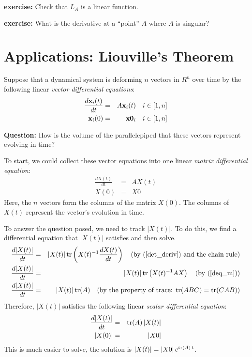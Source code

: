 \documentclass{article}
\begin{document}
{\bf exercise:} Check that $L_A$ is a linear function.

{\bf exercise:} What is the derivative at a ``point'' $A$ where $A$ is singular?

\section{Applications: Liouville's Theorem}
Suppose that a dynamical system is deforming $n$ vectors in $R^n$ over time by
the following linear {\em vector differential equations\/}:
\begin{eqnarray}
  \frac{d {\bf x}_i(t)}{dt} & = & A {\bf x}_i(t) \quad i \in [1, n] \label{deq_v}\\
  {\bf x}_i(0) & = & {\bf x0}_i \quad i \in [1,n]
\end{eqnarray}

{\bf Question:\/} How is the volume of the parallelepiped that these vectors represent
evolving in time?

To start, we could collect these vector equations into one linear
{\em matrix differential equation\/}:
\begin{eqnarray}
  \frac{d X(t)}{dt} & = & A X(t) \label{deq_m}\\
  X(0) & = & X0
\end{eqnarray}
Here, the $n$ vectors form the columns of the matrix $X(0)$. The columns of
$X(t)$ represent the vector's evolution in time.

To answer the question posed, 
we need to track $|X(t)|$. To do this, we find a differential equation
that $|X(t)|$ satisfies and then solve.
\begin{eqnarray*}
  \frac{d |X(t)|}{dt} & = & |X(t)| \, {\rm tr}\left(X(t)^{-1} \frac{d X(t)}{dt}\right)
  \quad \text{(by $(\ref{det_deriv})$ and the chain rule)} \\
  \frac{d |X(t)|}{dt} & = & |X(t)| \, {\rm tr}\left(X(t)^{-1} A X\right) \quad
  \text{(by $(\ref{deq_m})$)} \\
  \frac{d |X(t)|}{dt} & = & |X(t)| \, {\rm tr}(A) \quad
  \text{(by the property of trace: ${\rm tr}(ABC) = {\rm tr}(CAB)$)}
\end{eqnarray*}
Therefore, $|X(t)|$ satisfies the following linear {\em scalar differential equation\/}:
\begin{eqnarray}
  \frac{d |X(t)|}{dt} & = & {\rm tr}(A) \, |X(t)| \\
  |X(0)| & = & |X0|
\end{eqnarray}
This is much easier to solve, the solution is $|X(t)| = |X0| \, e^{{\rm tr}(A)\, t}$.
\end{document}
